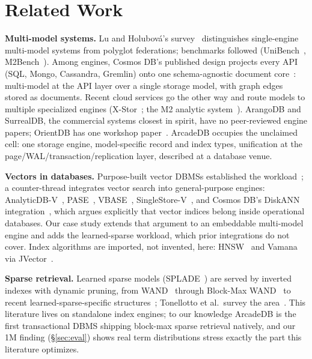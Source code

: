 \documentclass[conference]{IEEEtran}
\newcommand{\arcadedb}{ArcadeDB}
\begin{document}
\section{Related Work}\label{sec:related}

\textbf{Multi-model systems.} Lu and Holubov{\'a}'s
survey~\cite{lu2019multimodel} distinguishes single-engine multi-model
systems from polyglot federations; benchmarks followed
(UniBench~\cite{zhang2018unibench}, M2Bench~\cite{m2bench}). Among engines,
Cosmos DB's published design projects every API (SQL, Mongo, Cassandra,
Gremlin) onto one schema-agnostic document core~\cite{shukla2015documentdb}:
multi-model at the API layer over a single storage model, with graph edges
stored as documents. Recent cloud services go the other way and route models
to multiple specialized engines (X-Stor~\cite{lei2024xstor}; the M2 analytic
system~\cite{kim2025m2}). ArangoDB and SurrealDB, the commercial systems
closest in spirit, have no peer-reviewed engine papers; OrientDB has one
workshop paper~\cite{ritter2021orientdb}. \arcadedb{} occupies the
unclaimed cell: one storage engine, model-specific record and index types,
unification at the page/WAL/transaction/replication layer, described at a
database venue.

\textbf{Vectors in databases.} Purpose-built vector DBMSs established the
workload~\cite{wang2021milvus,guo2022manu}; a counter-thread integrates
vector search into general-purpose engines:
AnalyticDB-V~\cite{wei2020analyticdbv}, PASE~\cite{yang2020pase},
VBASE~\cite{zhang2023vbase}, SingleStore-V~\cite{chen2024singlestorev}, and
Cosmos DB's DiskANN integration~\cite{upreti2025cosmosvector}, which argues
explicitly that vector indices belong inside operational databases. Our case
study extends that argument to an embeddable multi-model engine and adds the
learned-sparse workload, which prior integrations do not cover. Index
algorithms are imported, not invented, here: HNSW~\cite{malkov2020hnsw} and
Vamana~\cite{subramanya2019diskann} via JVector~\cite{jvector2024repo}.

\textbf{Sparse retrieval.} Learned sparse models
(SPLADE~\cite{formal2021splade}) are served by inverted indexes with dynamic
pruning, from WAND~\cite{broder2003wand} through Block-Max
WAND~\cite{ding2011blockmax} to recent learned-sparse-specific
structures~\cite{bruch2024seismic}; Tonellotto et
al.~survey the area~\cite{tonellotto2018efficient}. This literature lives on
standalone index engines; to our knowledge \arcadedb{} is the first
transactional DBMS shipping block-max sparse retrieval natively, and our 1M
finding (\S\ref{sec:eval}) shows real term distributions stress exactly the
part this literature optimizes.
\end{document}
